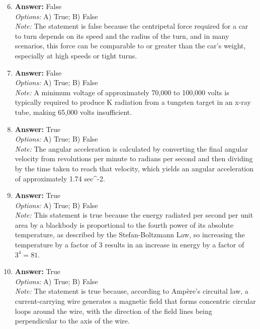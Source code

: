 \documentclass[12pt]{article}
\begin{document}
\begin{enumerate}[label=\arabic*.]
\setcounter{enumi}{5}
\item \textbf{Answer:} False
\\ \textit{Options:} A) True; B) False
\\ \textit{Note:} The statement is false because the centripetal force required for a car to turn depends on its speed and the radius of the turn, and in many scenarios, this force can be comparable to or greater than the car's weight, especially at high speeds or tight turns.
\item \textbf{Answer:} False
\\ \textit{Options:} A) True; B) False
\\ \textit{Note:} A minimum voltage of approximately 70,000 to 100,000 volts is typically required to produce K radiation from a tungsten target in an x-ray tube, making 65,000 volts insufficient.
\item \textbf{Answer:} True
\\ \textit{Options:} A) True; B) False
\\ \textit{Note:} The angular acceleration is calculated by converting the final angular velocity from revolutions per minute to radians per second and then dividing by the time taken to reach that velocity, which yields an angular acceleration of approximately 1.74 sec^-2.
\item \textbf{Answer:} True
\\ \textit{Options:} A) True; B) False
\\ \textit{Note:} This statement is true because the energy radiated per second per unit area by a blackbody is proportional to the fourth power of its absolute temperature, as described by the Stefan-Boltzmann Law, so increasing the temperature by a factor of 3 results in an increase in energy by a factor of \(3^4 = 81\).
\item \textbf{Answer:} True
\\ \textit{Options:} A) True; B) False
\\ \textit{Note:} The statement is true because, according to Ampère's circuital law, a current-carrying wire generates a magnetic field that forms concentric circular loops around the wire, with the direction of the field lines being perpendicular to the axis of the wire.
\end{enumerate}
\end{document}
